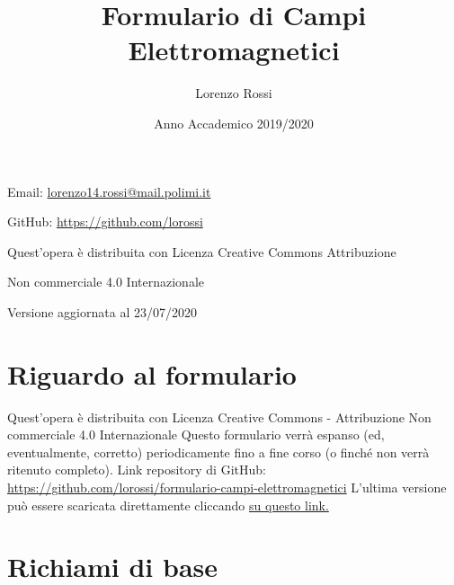 \documentclass{article}
\title{\Huge Formulario di Campi Elettromagnetici}
\author{\LARGE Lorenzo Rossi}
\date{\LARGE Anno Accademico 2019/2020}
\begin{document}
\maketitle

\vspace{18em}

\large
\begin{doublespacing}\hypersetup{
	urlcolor=black,
}
\centerline{Email: \href{mailto://lorenzo14.rossi@mail.polimi.it}{lorenzo14.rossi@mail.polimi.it}}
\centerline{GitHub: \url{https://github.com/lorossi}}

\vspace{18em}
\centerline{Quest'opera è distribuita con Licenza Creative Commons Attribuzione}
\centerline{Non commerciale 4.0 Internazionale \ccbynceu}
\centerline{Versione aggiornata al 23/07/2020}
\end{doublespacing}
\newpage


\tableofcontents
\clearpage
{}
\newpage

\section{Riguardo al formulario}
Quest'opera è distribuita con Licenza Creative Commons - Attribuzione Non commerciale 4.0 Internazionale \ccbynceu \newline
Questo formulario verrà espanso (ed, eventualmente, corretto) periodicamente fino a fine corso (o finché non verrà ritenuto completo). \newline
Link repository di GitHub: \url{https://github.com/lorossi/formulario-campi-elettromagnetici} \newline
L'ultima versione può essere scaricata direttamente cliccando \href{https://github.com/lorossi/formulario-campi-elettromagnetici/raw/master/formulario_campi.pdf}{su questo link.}

\section{Richiami di base}
\end{document}
